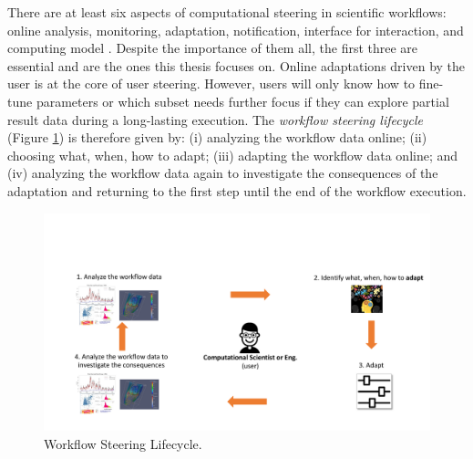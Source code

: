 There are at least six aspects of computational steering in scientific workflows: online analysis, monitoring, adaptation, notification, interface for interaction, and computing model \cite{Mattoso2015Dynamic}. Despite the importance of them all, the first three are essential and are the ones this thesis focuses on.
Online adaptations driven by the user is at the core of user steering.
 However, users will only know how to fine-tune parameters or which subset needs further focus if they can explore partial result data during a long-lasting execution.  The \textit{workflow steering lifecycle} (Figure \ref{fig:wfsteeringlifecycle}) is therefore given by:
    (i) analyzing the workflow data online;
    (ii) choosing what, when, how to adapt; 
    (iii) adapting the workflow data online; and
    (iv) analyzing the workflow data again to investigate the consequences of the adaptation and returning to the first step until the end of the workflow execution.
 

\begin{figure}[H]
    \centering
    \includegraphics[width=\textwidth,keepaspectratio]{img/wflifecycle.pdf}
    \caption{Workflow Steering Lifecycle.}
    \label{fig:wfsteeringlifecycle}
\end{figure}

